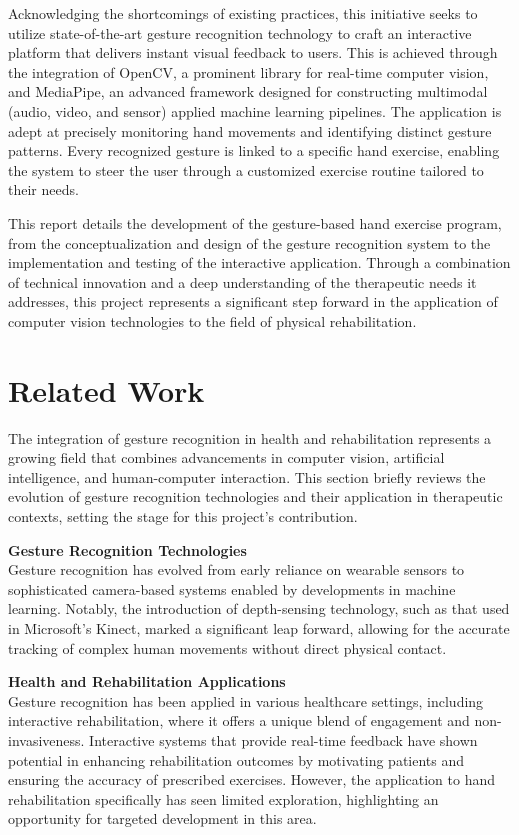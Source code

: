 \documentclass[12pt, letterpaper, twoside]{article}
\begin{document}
    Acknowledging the shortcomings of existing practices, this initiative seeks to utilize state-of-the-art gesture recognition technology to craft an interactive platform that delivers instant visual feedback to users. This is achieved through the integration of OpenCV, a prominent library for real-time computer vision, and MediaPipe, an advanced framework designed for constructing multimodal (audio, video, and sensor) applied machine learning pipelines. The application is adept at precisely monitoring hand movements and identifying distinct gesture patterns. Every recognized gesture is linked to a specific hand exercise, enabling the system to steer the user through a customized exercise routine tailored to their needs.
    
    This report details the development of the gesture-based hand exercise program, from the conceptualization and design of the gesture recognition system to the implementation and testing of the interactive application. Through a combination of technical innovation and a deep understanding of the therapeutic needs it addresses, this project represents a significant step forward in the application of computer vision technologies to the field of physical rehabilitation.

\section{Related Work}
\label{sec:conc}
    The integration of gesture recognition in health and rehabilitation represents a growing field that combines advancements in computer vision, artificial intelligence, and human-computer interaction. This section briefly reviews the evolution of gesture recognition technologies and their application in therapeutic contexts, setting the stage for this project's contribution.
    
    \textbf{Gesture Recognition Technologies}
    \\Gesture recognition has evolved from early reliance on wearable sensors to sophisticated camera-based systems enabled by developments in machine learning. Notably, the introduction of depth-sensing technology, such as that used in Microsoft's Kinect, marked a significant leap forward, allowing for the accurate tracking of complex human movements without direct physical contact.
    
    \textbf{Health and Rehabilitation Applications}
    \\Gesture recognition has been applied in various healthcare settings, including interactive rehabilitation, where it offers a unique blend of engagement and non-invasiveness. Interactive systems that provide real-time feedback have shown potential in enhancing rehabilitation outcomes by motivating patients and ensuring the accuracy of prescribed exercises. However, the application to hand rehabilitation specifically has seen limited exploration, highlighting an opportunity for targeted development in this area.
    
\end{document}
